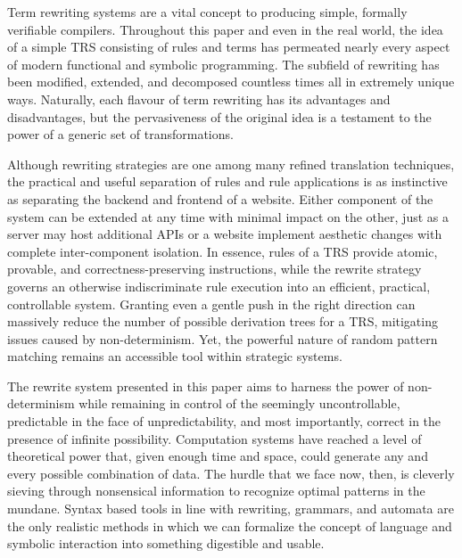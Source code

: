 \documentclass{article}
\begin{document}
Term rewriting systems are a vital concept to producing simple, formally verifiable compilers.
Throughout this paper and even in the real world, the idea of a simple TRS consisting of rules and terms
has permeated nearly every aspect of modern functional and symbolic programming. The subfield of rewriting has been modified, extended, and decomposed
countless times all in extremely unique ways. Naturally, each flavour of term rewriting has its advantages and disadvantages, but the pervasiveness of the original idea
is a testament to the power of a generic set of transformations.

Although rewriting strategies are one among many refined translation techniques,
the practical and useful separation of rules and rule applications
is as instinctive as separating the backend and frontend of a website.
Either component of the system can be extended at any time with minimal impact on the other,
just as a server may host additional APIs or a website implement aesthetic changes with complete inter-component isolation.
In essence, rules of a TRS provide atomic, provable, and correctness-preserving instructions,
while the rewrite strategy governs an otherwise indiscriminate rule execution into an efficient, practical, controllable system.
Granting even a gentle push in the right direction can massively reduce the number of possible derivation trees for a TRS,
mitigating issues caused by non-determinism. Yet, the powerful nature of random pattern matching remains an accessible tool within strategic systems.

The rewrite system presented in this paper aims
to harness the power of non-determinism while remaining in control of the seemingly uncontrollable,
predictable in the face of unpredictability, and most importantly, correct in the presence of infinite possibility.
Computation systems have reached a level of theoretical power that, given enough time and space, could generate any and every possible
combination of data. The hurdle that we face now, then, is cleverly sieving through nonsensical information to recognize optimal patterns in the mundane.
Syntax based tools in line with rewriting, grammars, and automata are the only realistic methods in which we can formalize the concept of language and symbolic interaction
into something digestible and usable.

\pagebreak
\nocite{*} %
\printbibliography %
\end{document}
